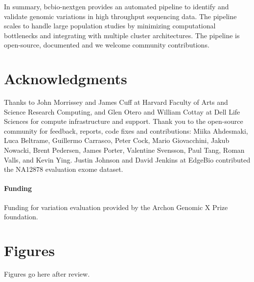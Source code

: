 \documentclass{frontiersSCNS}
\begin{document}
In summary, bcbio-nextgen provides an automated pipeline to identify and
validate genomic variations in high throughput sequencing data. The
pipeline scales to handle large population studies by minimizing computational
bottlenecks and integrating with multiple cluster architectures. The pipeline is
open-source, documented and we welcome community contributions.

\section*{Acknowledgments}

Thanks to John Morrissey and James Cuff at Harvard Faculty of Arts and Science
Research Computing, and Glen Otero and William Cottay at Dell Life Sciences for
compute infrastructure and support. Thank you to the open-source community for
feedback, reports, code fixes and contributions: Miika Ahdesmaki, Luca Beltrame,
Guillermo Carrasco, Peter Cock, Mario Giovacchini, Jakub Nowacki, Brent
Pedersen, James Porter, Valentine Svensson, Paul Tang, Roman Valls, and Kevin
Ying. Justin Johnson and David Jenkins at EdgeBio contributed the NA12878
evaluation exome dataset.

\paragraph{Funding} Funding for variation evaluation provided by the Archon
Genomic X Prize foundation.



\section*{Figures}

Figures go here after review.
\end{document}
